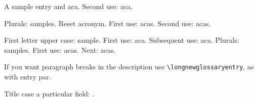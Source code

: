 \documentclass{article}
\begin{document}
A \gls{sample} entry and \gls{aca}. Second use: \gls{aca}.

Plurals: \glspl{sample}. Reset acronym.
First use: \glspl{aca}. Second use: \glspl{aca}.

\glsresetall
First letter upper case: \Gls{sample}. First use: \Gls{aca}.
Subsequent use: \Gls{aca}.
\glsresetall
Plurals: \Glspl{sample}. First use: \Glspl{aca}. Next: \Glspl{aca}.

If you want paragraph breaks in the description use
\verb|\longnewglossaryentry|, as with entry \gls{par}.

Title case a particular field:
.

\printglossaries
\end{document}
